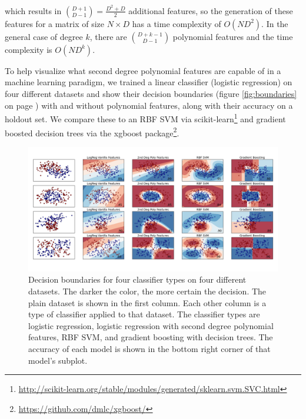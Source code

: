 \documentclass[11pt,onecolumn]{article}
\begin{document}
which results in $\binom{D+1}{D-1} = \frac{D^2+D}{2}$ additional features, so the generation of 
these features for a matrix of size $N \times D$ has a time complexity of $O(ND^2)$. In the general case of degree $k$, there 
are $\binom{D+k-1}{D-1}$ polynomial features and the time complexity is $O(ND^k)$.

To help visualize what second degree polynomial features are capable of in a machine learning paradigm,
we trained a linear classifier (logistic regression) on four different datasets and show their decision
boundaries (figure \eqref{fig:boundaries} on page \pageref{fig:boundaries}) with and without polynomial features, along with their accuracy on a holdout set. We compare
these to an RBF SVM via scikit-learn\footnote{\url{http://scikit-learn.org/stable/modules/generated/sklearn.svm.SVC.html}} 
and gradient boosted decision trees via the xgboost package\footnote{\url{https://github.com/dmlc/xgboost/}}.


\begin{figure}
    \centering
    \includegraphics[scale=0.5]{classifier_boundaries.png}
    \caption{Decision boundaries for four classifier types on four different datasets. The darker the color, the more certain the decision.
             The plain dataset is shown in the first column. Each other column is a type of classifier applied to that dataset. The classifier
             types are logistic regression, logistic regression with second degree polynomial features, RBF SVM, and gradient boosting with decision trees.
             The accuracy of each model is shown in the bottom right corner of that model's subplot.}
    \label{fig:boundaries}
\end{figure}
\end{document}
